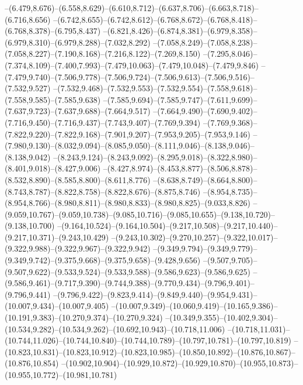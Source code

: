   --(6.479,8.676)--(6.558,8.629)--(6.610,8.712)--(6.637,8.706)--(6.663,8.718)--(6.716,8.656)%
  --(6.742,8.655)--(6.742,8.612)--(6.768,8.672)--(6.768,8.418)--(6.768,8.378)--(6.795,8.437)%
  --(6.821,8.426)--(6.874,8.381)--(6.979,8.358)--(6.979,8.310)--(6.979,8.288)--(7.032,8.292)%
  --(7.058,8.249)--(7.058,8.238)--(7.058,8.227)--(7.190,8.168)--(7.216,8.122)--(7.269,8.150)%
  --(7.295,8.046)--(7.374,8.109)--(7.400,7.993)--(7.479,10.063)--(7.479,10.048)--(7.479,9.846)%
  --(7.479,9.740)--(7.506,9.778)--(7.506,9.724)--(7.506,9.613)--(7.506,9.516)--(7.532,9.527)%
  --(7.532,9.468)--(7.532,9.553)--(7.532,9.554)--(7.558,9.618)--(7.558,9.585)--(7.585,9.638)%
  --(7.585,9.694)--(7.585,9.747)--(7.611,9.699)--(7.637,9.723)--(7.637,9.688)--(7.664,9.517)%
  --(7.664,9.490)--(7.690,9.402)--(7.716,9.450)--(7.716,9.437)--(7.743,9.407)--(7.769,9.394)%
  --(7.769,9.368)--(7.822,9.220)--(7.822,9.168)--(7.901,9.207)--(7.953,9.205)--(7.953,9.146)%
  --(7.980,9.130)--(8.032,9.094)--(8.085,9.050)--(8.111,9.046)--(8.138,9.046)--(8.138,9.042)%
  --(8.243,9.124)--(8.243,9.092)--(8.295,9.018)--(8.322,8.980)--(8.401,9.018)--(8.427,9.006)%
  --(8.427,8.974)--(8.453,8.877)--(8.506,8.878)--(8.532,8.890)--(8.585,8.800)--(8.611,8.776)%
  --(8.638,8.749)--(8.664,8.800)--(8.743,8.787)--(8.822,8.758)--(8.822,8.676)--(8.875,8.746)%
  --(8.954,8.735)--(8.954,8.766)--(8.980,8.811)--(8.980,8.833)--(8.980,8.825)--(9.033,8.826)%
  --(9.059,10.767)--(9.059,10.738)--(9.085,10.716)--(9.085,10.655)--(9.138,10.720)--(9.138,10.700)%
  --(9.164,10.524)--(9.164,10.504)--(9.217,10.508)--(9.217,10.440)--(9.217,10.371)--(9.243,10.429)%
  --(9.243,10.302)--(9.270,10.257)--(9.322,10.017)--(9.322,9.988)--(9.322,9.967)--(9.322,9.942)%
  --(9.349,9.794)--(9.349,9.779)--(9.349,9.742)--(9.375,9.668)--(9.375,9.658)--(9.428,9.656)%
  --(9.507,9.705)--(9.507,9.622)--(9.533,9.524)--(9.533,9.588)--(9.586,9.623)--(9.586,9.625)%
  --(9.586,9.461)--(9.717,9.390)--(9.744,9.388)--(9.770,9.434)--(9.796,9.401)--(9.796,9.441)%
  --(9.796,9.422)--(9.823,9.414)--(9.849,9.440)--(9.954,9.431)--(10.007,9.434)--(10.007,9.405)%
  --(10.007,9.349)--(10.060,9.419)--(10.165,9.386)--(10.191,9.383)--(10.270,9.374)--(10.270,9.324)%
  --(10.349,9.355)--(10.402,9.304)--(10.534,9.282)--(10.534,9.262)--(10.692,10.943)--(10.718,11.006)%
  --(10.718,11.031)--(10.744,11.026)--(10.744,10.840)--(10.744,10.789)--(10.797,10.781)--(10.797,10.819)%
  --(10.823,10.831)--(10.823,10.912)--(10.823,10.985)--(10.850,10.892)--(10.876,10.867)--(10.876,10.854)%
  --(10.902,10.904)--(10.929,10.872)--(10.929,10.870)--(10.955,10.873)--(10.955,10.772)--(10.981,10.781)%

